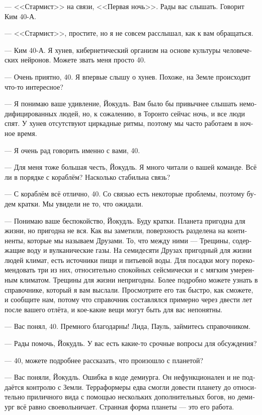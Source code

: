 \documentclass[a4paper,10pt,fleqn]{book}\usepackage{polyglossia}\setdefaultlanguage[babelshorthands=true]{russian}\setotherlanguage{english}\defaultfontfeatures{Ligatures=TeX,Mapping=tex-text}\usepackage{xcolor}\newcommand{\ml}[3]{#2}
\begin{document}
--- <<Стармист>> на связи, <<Первая ночь>>.
Рады вас слышать.
Говорит Ким 40-А.

--- <<Стармист>>, простите, но я не совсем расслышал, как к вам обращаться.

--- Ким 40-А.
Я хунев, кибернетический организм на основе культуры человеческих нейронов.
Можете звать меня просто 40.

--- Очень приятно, 40.
Я впервые слышу о хунев.
Похоже, на Земле происходит что-то интересное?

--- Я понимаю ваше удивление, Йокудль.
Вам было бы привычнее слышать немодифицированных людей, но, к сожалению, в Торонто сейчас ночь, и все люди спят.
У хунев отсутствуют циркадные ритмы, поэтому мы часто работаем в ночное время.

--- Я очень рад говорить именно с вами, 40.

--- Для меня тоже большая честь, Йокудль.
Я много читали о вашей команде.
Всё ли в порядке с кораблём?
Насколько стабильна связь?

--- С кораблём всё отлично, 40.
Со связью есть некоторые проблемы, поэтому будем кратки.
Мы увидели не то, что ожидали.

--- Понимаю ваше беспокойство, Йокудль.
Буду кратки.
Планета пригодна для жизни, но пригодна не вся.
Как вы заметили, поверхность разделена на континенты, которые мы называем Друзами.
То, что между ними --- Трещины, содержащие воду и вулканические газы.
На семидесяти Друзах пригодный для жизни людей климат, есть источники пищи и питьевой воды.
Для посадки могу порекомендовать три из них, относительно спокойных сейсмически и с мягким умеренным климатом.
Трещины для жизни непригодны.
Более подробно можете узнать в справочнике, который я вам выслали.
Просмотрите его так быстро, как сможете, и сообщите нам, потому что справочник составлялся примерно через двести лет после вашего отлёта, и кое-какие вещи могут быть для вас непонятны.

--- Вас понял, 40.
Премного благодарны!
Лида, Пауль, займитесь справочником.

--- Рады помочь, Йокудль.
У вас есть какие-то срочные вопросы для обсуждения?

--- 40, можете подробнее рассказать, что произошло с планетой?

--- Вас поняли, Йокудль.
Ошибка в коде демиурга.
Он нефункционален и не поддаётся контролю с Земли.
Терраформеры едва смогли довести планету до относительно приличного вида с помощью нескольких дополнительных богов, но демиург всё равно своевольничает.
Странная форма планеты --- это его работа.
\end{document}
